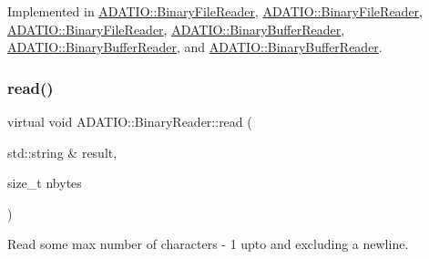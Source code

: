 Implemented in \mbox{\hyperlink{classADATIO_1_1BinaryFileReader_ae0985a1157f9baa87580606cfcf98908}{A\+D\+A\+T\+I\+O\+::\+Binary\+File\+Reader}}, \mbox{\hyperlink{classADATIO_1_1BinaryFileReader_ae0985a1157f9baa87580606cfcf98908}{A\+D\+A\+T\+I\+O\+::\+Binary\+File\+Reader}}, \mbox{\hyperlink{classADATIO_1_1BinaryFileReader_ae0985a1157f9baa87580606cfcf98908}{A\+D\+A\+T\+I\+O\+::\+Binary\+File\+Reader}}, \mbox{\hyperlink{classADATIO_1_1BinaryBufferReader_a32d746446a4c990f3c592a32753d7207}{A\+D\+A\+T\+I\+O\+::\+Binary\+Buffer\+Reader}}, \mbox{\hyperlink{classADATIO_1_1BinaryBufferReader_a32d746446a4c990f3c592a32753d7207}{A\+D\+A\+T\+I\+O\+::\+Binary\+Buffer\+Reader}}, and \mbox{\hyperlink{classADATIO_1_1BinaryBufferReader_a32d746446a4c990f3c592a32753d7207}{A\+D\+A\+T\+I\+O\+::\+Binary\+Buffer\+Reader}}.

\mbox{\label{classADATIO_1_1BinaryReader_a4d79cabea18fccc818eaf2c45ed21b1f}} 
\subsubsection{\texorpdfstring{read()}{read()}\hspace{0.1cm}{\footnotesize\ttfamily [1/33]}}
{\footnotesize\ttfamily virtual void A\+D\+A\+T\+I\+O\+::\+Binary\+Reader\+::read (\begin{DoxyParamCaption}\item[{std\+::string \&}]{result,  }\item[{size\+\_\+t}]{nbytes }\end{DoxyParamCaption})\hspace{0.3cm}{\ttfamily [virtual]}}



Read some max number of characters -\/ 1 upto and excluding a newline. 

